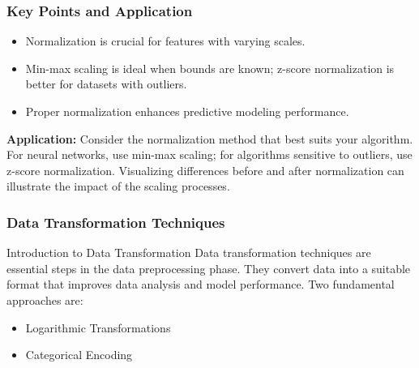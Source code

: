 \documentclass[aspectratio=169]{beamer}
\begin{document}
\begin{frame}[fragile]
    \frametitle{Key Points and Application}
    \begin{itemize}
        \item Normalization is crucial for features with varying scales.
        \item Min-max scaling is ideal when bounds are known; z-score normalization is better for datasets with outliers.
        \item Proper normalization enhances predictive modeling performance.
    \end{itemize}
    
    \textbf{Application:} Consider the normalization method that best suits your algorithm. For neural networks, use min-max scaling; for algorithms sensitive to outliers, use z-score normalization. Visualizing differences before and after normalization can illustrate the impact of the scaling processes.
\end{frame}

\begin{frame}[fragile]
    \frametitle{Data Transformation Techniques}
    \begin{block}{Introduction to Data Transformation}
        Data transformation techniques are essential steps in the data preprocessing phase. They convert data into a suitable format that improves data analysis and model performance. Two fundamental approaches are:
        \begin{itemize}
            \item Logarithmic Transformations
            \item Categorical Encoding
        \end{itemize}
    \end{block}
\end{frame}
\end{document}
